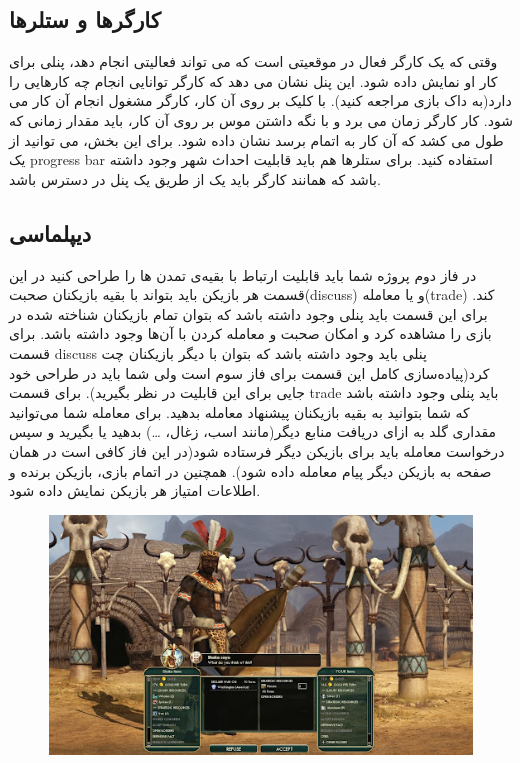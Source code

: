 \documentclass[]{article}
\begin{document}
\subsection*{{\titr کارگرها و ستلرها}}

وقتی که یک کارگر فعال در موقعیتی است که می تواند فعالیتی انجام دهد، پنلی برای کار او نمایش داده شود. این پنل نشان می دهد که کارگر توانایی انجام چه کارهایی را دارد(به داک بازی مراجعه کنید). با کلیک بر روی آن کار، کارگر مشغول انجام آن کار می شود. کار کارگر زمان می برد و با نگه داشتن موس بر روی آن کار، باید مقدار زمانی که طول می کشد که آن کار به اتمام برسد نشان داده شود. برای این بخش، می توانید از یک progress bar استفاده کنید.
برای ستلر‌ها هم باید قابلیت احداث شهر وجود داشته باشد که همانند کارگر باید یک از طریق یک پنل در دسترس باشد.


\subsection*{{\titr دیپلماسی}}

در فاز دوم پروژه شما باید قابلیت ارتباط با بقیه‌ی تمدن ها را طراحی کنید در این قسمت هر بازیکن باید بتواند با بقیه بازیکنان صحبت(discuss) و یا معامله(trade) کند. برای این قسمت باید پنلی وجود داشته باشد که بتوان تمام بازیکنان شناخته شده در بازی را مشاهده کرد و  امکان صحبت و معامله کردن با آن‌ها وجود داشته باشد. برای قسمت discuss پنلی باید وجود داشته باشد که بتوان با دیگر بازیکنان چت کرد(پیاده‌سازی کامل این قسمت برای فاز سوم است ولی شما باید در طراحی خود جایی برای این قابلیت در نظر بگیرید). برای قسمت trade باید پنلی وجود داشته باشد که شما بتوانید به بقیه بازیکنان پیشنهاد معامله بدهید. برای معامله شما می‌توانید مقداری گلد به ازای دریافت منابع دیگر(مانند اسب، زغال، …) بدهید یا بگیرید و سپس درخواست معامله باید برای بازیکن دیگر فرستاده شود(در این فاز کافی است در همان صفحه به بازیکن دیگر پیام معامله داده شود). همچنین در اتمام بازی، بازیکن برنده و اطلاعات امتیاز هر بازیکن نمایش داده شود.

\begin{figure}[H]
    \centerline{\includegraphics[scale=0.8]{resources/diplomacy.jpg}}
\end{figure}
\end{document}

